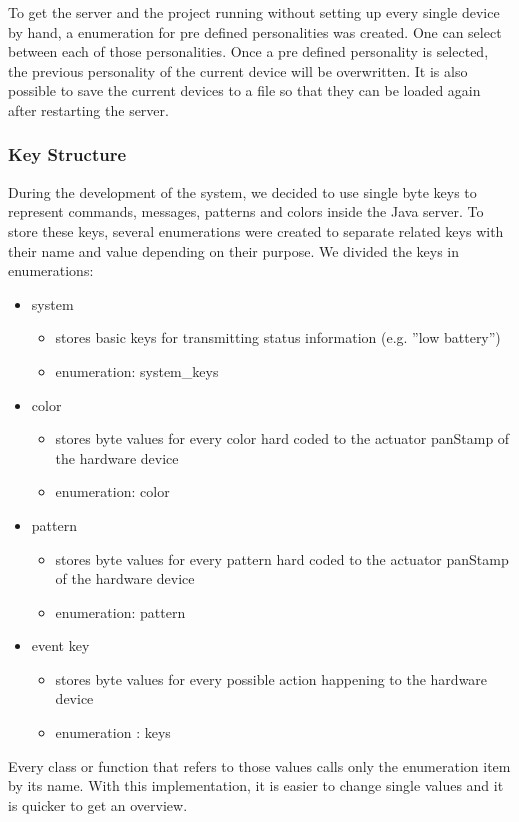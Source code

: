 To get the server and the project running without setting up every single device
by hand, a enumeration for pre defined personalities was created. One can select
between each of those personalities. Once a pre defined personality is selected,
the previous personality of the current device will be overwritten. It is also possible to save the current devices to a file so that they can be loaded again after restarting the server.
\newline

\subsubsection{Key Structure}
During the development of the system, we decided to use single byte keys to represent commands, messages, patterns and colors inside the Java server. To store these keys, several enumerations were created to separate related keys with their name and value depending on their purpose.
We divided the keys in enumerations:
\begin{itemize}
    \item system
    \begin{itemize}
         \item stores basic keys for transmitting status information (e.g. ''low battery'')
				 \item enumeration: system\_keys
    \end{itemize}
    \item color
    \begin{itemize}
        \item stores byte values for every color hard coded to the actuator panStamp of the hardware device
				\item enumeration: color
    \end{itemize}
    \item pattern
    \begin{itemize}
        \item stores byte values for every pattern hard coded to the actuator panStamp of the hardware device
				\item enumeration: pattern
    \end{itemize}
    \item event key
    \begin{itemize}
        \item stores byte values for every possible action happening to the hardware device
				\item enumeration : keys
    \end{itemize}
\end{itemize} 

Every class or function that refers to those values calls only the enumeration item by its name. With this implementation, it is easier to change single values and it is quicker to get an overview.
